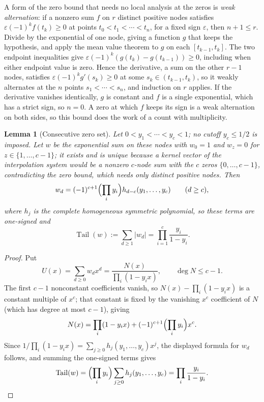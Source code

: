\documentclass[11pt]{article}
\newtheorem{lemma}[theorem]{Lemma}
\DeclareMathOperator{\Tail}{Tail}
\begin{document}
A form of the zero bound that needs no local analysis at the zeros is
\emph{weak alternation}: if a nonzero sum $f$ on $r$ distinct positive nodes
satisfies $\varepsilon(-1)^kf(t_k)\ge0$ at points $t_0<t_1<\cdots<t_n$, for a
fixed sign $\varepsilon$, then $n+1\le r$.  Divide by the exponential of one
node, giving a function $g$ that keeps the hypothesis, and apply the mean
value theorem to $g$ on each $[t_{k-1},t_k]$.  The two endpoint inequalities
give $\varepsilon(-1)^k(g(t_k)-g(t_{k-1}))\ge0$, including when either
endpoint value is zero.  Hence the derivative, a sum on the other $r-1$
nodes, satisfies $\varepsilon(-1)^kg'(s_k)\ge0$ at some
$s_k\in(t_{k-1},t_k)$, so it weakly alternates at the $n$ points
$s_1<\cdots<s_n$, and induction on $r$ applies.  If the derivative vanishes
identically, $g$ is constant and $f$ is a
single exponential, which has a strict sign, so $n=0$.  A zero at which $f$ keeps its sign is a weak
alternation on both sides, so this bound does the work of a count with
multiplicity.

\begin{lemma}[Consecutive zero set]\label{lem:consecutive}
Let $0<y_1<\cdots<y_c<1$; no cutoff $y_c\le1/2$ is imposed.  Let $w$ be the
exponential sum on these nodes with $w_0=1$ and $w_z=0$ for $z\in\{1,\ldots,c-1\}$;
it exists and is unique because a kernel vector of the interpolation system
would be a nonzero $c$-node sum with the $c$ zeros $\{0,\ldots,c-1\}$,
contradicting the zero bound, which needs only distinct positive nodes.  Then
\[
  w_d=(-1)^{c+1}\Bigl(\prod_iy_i\Bigr)h_{d-c}(y_1,\ldots,y_c)
  \qquad(d\ge c),
\]
where $h_j$ is the complete homogeneous symmetric polynomial, so these terms
are one-signed and
\[
  \Tail(w):=\sum_{d\ge1}|w_d|=\prod_{i=1}^c\frac{y_i}{1-y_i}.
\]
\end{lemma}

\begin{proof}
Put
\[
  U(x)=\sum_{d\ge0}w_dx^d=\frac{N(x)}{\prod_i(1-y_ix)},
  \qquad \deg N\le c-1.
\]
The first $c-1$ nonconstant coefficients vanish, so $N(x)-\prod_i(1-y_ix)$
is a constant multiple of $x^c$; that constant is fixed by the vanishing
$x^c$ coefficient of $N$ (which has degree at most $c-1$), giving
\[
  N(x)=\prod_i(1-y_ix)+(-1)^{c+1}\Bigl(\prod_i y_i\Bigr)x^c .
\]
Since $1/\prod_i(1-y_ix)=\sum_{j\ge0}h_j(y_1,\ldots,y_c)x^j$, the displayed
formula for $w_d$ follows, and summing the one-signed terms gives
\[
  \Tail(w)=\Bigl(\prod_i y_i\Bigr)\sum_{j\ge0}h_j(y_1,\ldots,y_c)
          =\prod_i\frac{y_i}{1-y_i}.
\]
\end{proof}
\end{document}

